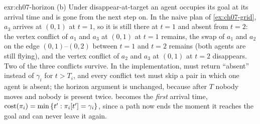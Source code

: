 \begin{solution}{exr:ch07-horizon}
(b) Under disappear-at-target an agent occupies its goal at its arrival time and is gone from the next step on. In the naive plan of \cref{ex:ch07-grid}, $a_3$ arrives at $(0,1)$ at $t=1$, so it is still there at $t=1$ and absent from $t=2$: the vertex conflict of $a_1$ and $a_3$ at $(0,1)$ at $t=1$ remains, the swap of $a_1$ and $a_2$ on the edge $(0,1)$--$(0,2)$ between $t=1$ and $t=2$ remains (both agents are still flying), and the vertex conflict of $a_2$ and $a_3$ at $(0,1)$ at $t=2$ disappears. Two of the three conflicts survive. In the implementation, \MapfPosition must return ``absent'' instead of $\gamma_i$ for $t>T_i$, and every conflict test must skip a pair in which one agent is absent; the horizon argument is unchanged, because after $T$ nobody moves and nobody is present twice.  becomes the \emph{first} arrival time, $\operatorname{cost}(\pi_i)=\min\left\{ t':\pi_i[t']=\gamma_i \right\}$, since a path now ends the moment it reaches the goal and can never leave it again.
\end{solution}

